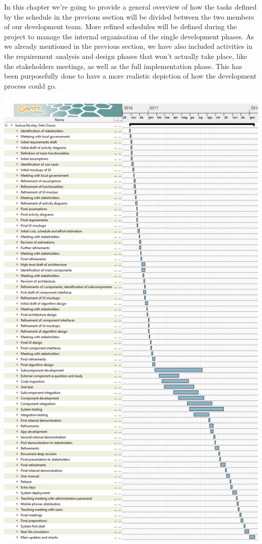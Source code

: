 \documentclass{article}
\begin{document}
\begin{flushleft}
In this chapter we're going to provide a general overview of how the tasks defined by the schedule in the previous section will be divided between the two members of our development team. More refined schedules will be defined during the project to manage the internal organisation of the single development phases.
As we already mentioned in the previous section, we have also included activities in the requirement analysis and design phases that won't actually take place, like the stakeholders meetings, as well as the full implementation phase. This has been purposefully done to have a more realistic depiction of how the development process could go. 
\includegraphics[scale=0.3]{ganttNico}

\end{flushleft}
\end{document}

